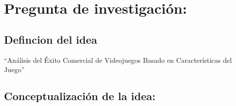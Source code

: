 \documentclass[
  letterpaper,
  DIV=11,
  numbers=noendperiod]{scrreprt}
\begin{document}
\section{Pregunta de investigación:}\label{pregunta-de-investigaciuxf3n}

\subsection{Defincion del idea}\label{defincion-del-idea}

``Análisis del Éxito Comercial de Videojuegos Basado en Características
del Juego''

\subsection{Conceptualización de la
idea:}\label{conceptualizaciuxf3n-de-la-idea}
\end{document}
